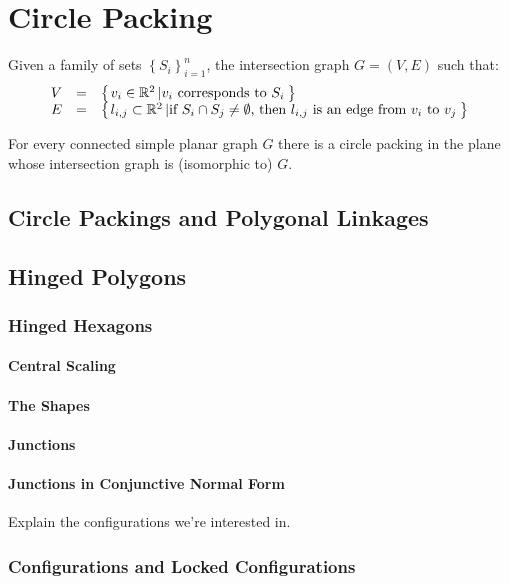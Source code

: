 \section{Circle Packing}
\begin{definition}\label{def2-1}
Given a family of sets $\left\lbrace S_i \right\rbrace_{i =1}^n $, the intersection graph $G=(V,E)$ such that:
\begin{equation}\label{eqn2-1}
\begin{array}{rcl}
V &=& {\left\lbrace \left. v_i \in {\mathbb{R}}^2 \left\vert v_i \text{ corresponds to }S_i \right.\right.\right\rbrace }\\
E &=& {\left\lbrace \left. l_{i,j} \subset {\mathbb{R}}^2 \left\vert  \text{if }S_i \cap S_j \neq \emptyset\text{, then } l_{i,j} \text{ is an edge from } v_i \text{ to } v_j \right.\right.\right\rbrace }
\end{array} 
\end{equation} 
\end{definition} 

\begin{thm}\label{thm2-1}
For every connected simple planar graph $G$ there is a circle packing in the plane whose intersection graph is (isomorphic to) $G$.
\end{thm}
\subsection{Circle Packings and Polygonal Linkages}
\subsection{Hinged Polygons}
\subsubsection{Hinged Hexagons}
\paragraph{Central Scaling}
\paragraph{The Shapes}
\paragraph{Junctions}
\paragraph{Junctions in Conjunctive Normal Form}
Explain the configurations we're interested in.
\subsubsection{Configurations and Locked Configurations}